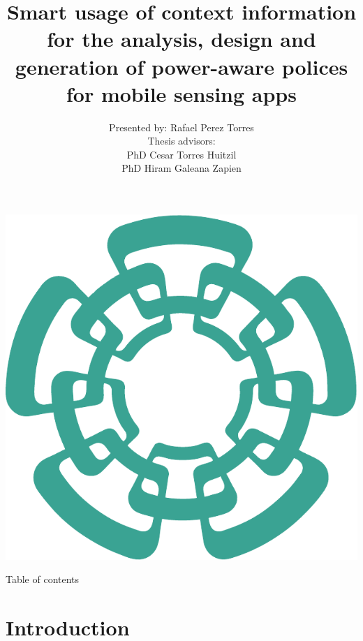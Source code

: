 \documentclass[compress,9pt,xcolor={dvipsnames,table}]{beamer}
\title[Smart usage of context information for the analysis, design and generation of power-aware polices for mobile sensing apps]{ Smart usage of context information for the analysis, design and generation of power-aware polices for mobile sensing apps}
\author[Rafael Perez Torres]{Presented by: Rafael Perez Torres\\[0.5cm] Thesis advisors:\\PhD Cesar Torres Huitzil\\PhD Hiram Galeana Zapien}
\institute{Cinvestav Tamaulipas}
\date{}
\begin{document}
\begin{frame}[plain]
  \begin{center}
  \includegraphics[scale=0.12]{../../../resources/images/vectors/cinvestav-logo-no-text}
  \end{center}
  \titlepage
  
\end{frame}


\begin{frame}{Table of contents}
	\tableofcontents[hideallsubsections]
\end{frame}

\section{Introduction}
\end{document}
